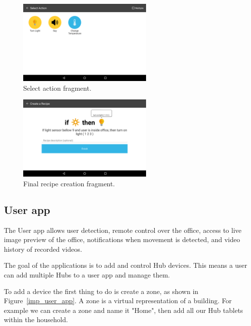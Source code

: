 \begin{figure}[H]
\centering
\includegraphics[width=0.6\textwidth]{Figures/screen_actions}
\caption{Select action fragment.}
\label{screen_actions}
\end{figure}

\begin{figure}[H]
\centering
\includegraphics[width=0.6\textwidth]{Figures/screen_completed_recipe}
\caption{Final recipe creation fragment.}
\label{screen_completed_recipe}
\end{figure}





\subsection{User app}


The User app allows user detection, remote control over the office, access to live image preview of the office, notifications when movement is detected, and video history of recorded videos.

The goal of the applications is to add and control Hub devices. This means a user can add multiple Hubs to a user app and manage them. 

To add a device the first thing to do is create a zone, as shown in Figure~\ref{imp_user_app}. A zone is a virtual representation of a building. For example we can create a zone and name it "Home", then add all our Hub tablets within the household. 

